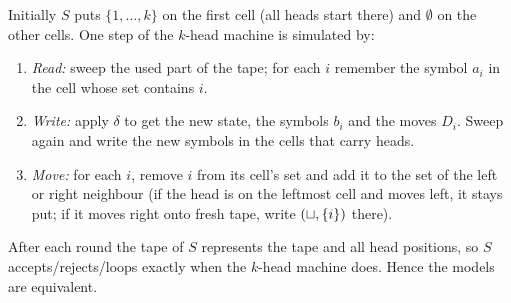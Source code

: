 \begin{soln}
Initially $S$ puts $\{1,\dots,k\}$ on the first cell (all heads start there) and $\emptyset$ on the other cells.
One step of the $k$-head machine is simulated by:
\begin{enumerate}
\item \emph{Read:} sweep the used part of the tape; for each $i$ remember the symbol $a_i$ in the cell whose set contains $i$.
\item \emph{Write:} apply $\delta$ to get the new state, the symbols $b_i$ and the moves $D_i$. Sweep again and write the new symbols in the cells that carry heads.
\item \emph{Move:} for each $i$, remove $i$ from its cell's set and add it to the set of the left or right neighbour (if the head is on the leftmost cell and moves left, it stays put; if it moves right onto fresh tape, write $(\sqcup,\{i\})$ there).
\end{enumerate}
After each round the tape of $S$ represents the tape and all head positions, so $S$ accepts/rejects/loops exactly when the $k$-head machine does. Hence the models are equivalent.
\end{soln}

